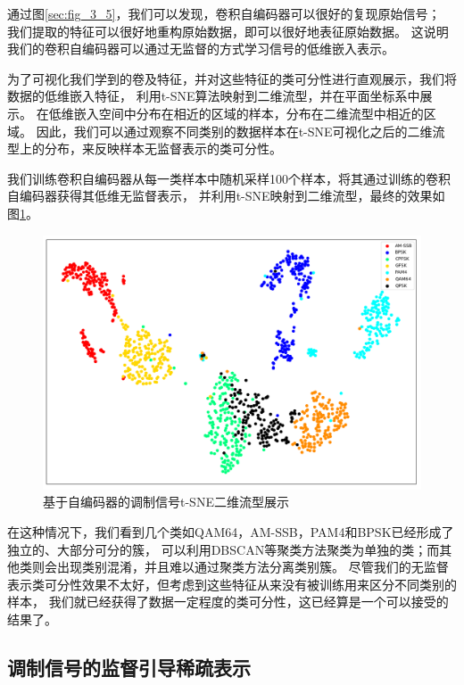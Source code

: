 通过图\ref{sec:fig_3_5}，我们可以发现，卷积自编码器可以很好的复现原始信号；
我们提取的特征可以很好地重构原始数据，即可以很好地表征原始数据。
这说明我们的卷积自编码器可以通过无监督的方式学习信号的低维嵌入表示。\par

为了可视化我们学到的卷及特征，并对这些特征的类可分性进行直观展示，我们将数据的低维嵌入特征，
利用t-SNE算法映射到二维流型，并在平面坐标系中展示。
在低维嵌入空间中分布在相近的区域的样本，分布在二维流型中相近的区域。
因此，我们可以通过观察不同类别的数据样本在t-SNE可视化之后的二维流型上的分布，来反映样本无监督表示的类可分性。\par

我们训练卷积自编码器从每一类样本中随机采样100个样本，将其通过训练的卷积自编码器获得其低维无监督表示，
并利用t-SNE映射到二维流型，最终的效果如图\ref{sec:fig_3_6}。

\begin{figure}[!h]
	\centering
	\includegraphics[scale=0.4]{figures/chapter_3/fig_3_6}
	\caption{基于自编码器的调制信号t-SNE二维流型展示}	\label{sec:fig_3_6}
\end{figure}

在这种情况下，我们看到几个类如QAM64，AM-SSB，PAM4和BPSK已经形成了独立的、大部分可分的簇，
可以利用DBSCAN等聚类方法聚类为单独的类；而其他类则会出现类别混淆，并且难以通过聚类方法分离类别簇。 
尽管我们的无监督表示类可分性效果不太好，但考虑到这些特征从来没有被训练用来区分不同类别的样本，
我们就已经获得了数据一定程度的类可分性，这已经算是一个可以接受的结果了。 \par 

\subsection{调制信号的监督引导稀疏表示}


